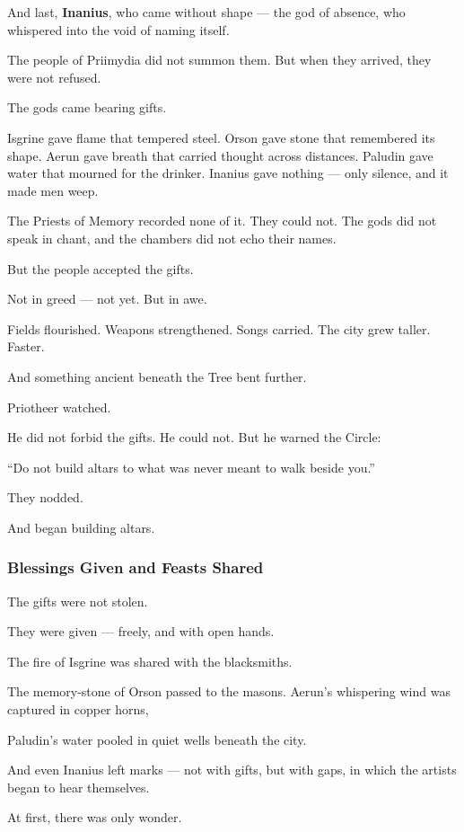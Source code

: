 \documentclass[12pt]{article}
\begin{document}
And last, \textbf{Inanius}, who came without shape — the god of absence, who whispered into the void of naming itself.

The people of Priimydia did not summon them.  
But when they arrived, they were not refused.

The gods came bearing gifts.

Isgrine gave flame that tempered steel.  
Orson gave stone that remembered its shape.  
Aerun gave breath that carried thought across distances.  
Paludin gave water that mourned for the drinker.  
Inanius gave nothing — only silence, and it made men weep.

The Priests of Memory recorded none of it.  
They could not.  
The gods did not speak in chant, and the chambers did not echo their names.

But the people accepted the gifts.

Not in greed — not yet.  
But in awe.

Fields flourished.  
Weapons strengthened.  
Songs carried.  
The city grew taller.  
Faster.

And something ancient beneath the Tree bent further.

Priotheer watched.

He did not forbid the gifts.  
He could not.  
But he warned the Circle:

“Do not build altars to what was never meant to walk beside you.”

They nodded.

And began building altars.


\dotfill

\subsubsection*{Blessings Given and Feasts Shared}

The gifts were not stolen.  

They were given — freely, and with open hands.

The fire of Isgrine was shared with the blacksmiths.  

The memory-stone of Orson passed to the masons.  
Aerun’s whispering wind was captured in copper horns,  

Paludin’s water pooled in quiet wells beneath the city.  

And even Inanius left marks —  
not with gifts, but with gaps,  
in which the artists began to hear themselves.

At first, there was only wonder.
\end{document}

